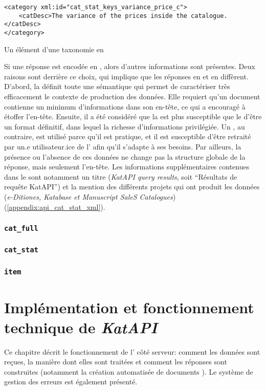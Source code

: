 \begin{listing}[h]
	\begin{verbatim}
<category xml:id="cat_stat_keys_variance_price_c">
	<catDesc>The variance of the prices inside the catalogue.</catDesc>
</category>
	\end{verbatim}
	\caption{Un élément d'une taxonomie en \tei{}}
	\label{code:taxonomy}
\end{listing}

Si une réponse est encodée en \tei{}, alors d'autres informations sont présentes. Deux raisons sont derrière ce choix, qui implique que les réponses en \json{} et en \tei{} diffèrent. D'abord, la \tei{} définit toute une sémantique qui permet de caractériser très efficacement le contexte de production des données. Elle requiert qu'un document contienne un minimum d'informations dans son en-tête, ce qui a encouragé à étoffer l'en-tête. Ensuite, il a été considéré que la \tei{} est plus susceptible que le \json{} d'être un format définitif, dans lequel la richesse d'informations privilégiée. Un \json{}, au contraire, est utilisé parce qu'il est pratique, et il est susceptible d'être retraité par un.e utilisateur.ice de l'\api{} afin qu'il s'adapte à ses besoins. Par ailleurs, la présence ou l'absence de ces données ne change pas la structure globale de la réponse, mais seulement l'en-tête. Les informations supplémentaires contenues dans le \tei{} sont notamment un titre (\textit{KatAPI query results}, soit \enquote{Résultats de requête KatAPI}) et la mention des différents projets qui ont produit les données (\textit{e-Ditiones, Katabase et Manuscript SaleS Catalogues}) (\ref{appendix:api_cat_stat_xml}).


\subsection{\texttt{cat\_full}}

\subsection{\texttt{cat\_stat}}

\subsection{\texttt{item}}

\chapter{Implémentation et fonctionnement technique de \textit{KatAPI}}
Ce chapitre décrit le fonctionnement de l'\api{} côté serveur: comment les données sont reçues, la manière dont elles sont traitées et comment les réponses sont construites (notamment la création automatisée de documents \xmltei{}). Le système de gestion des erreurs est également présenté.

